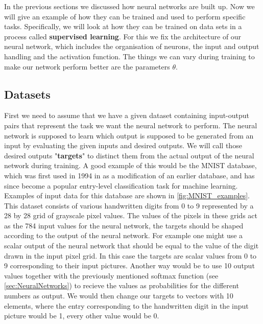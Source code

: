 In the previous sections we discussed how neural networks are built up. Now we will give an example of how they can be trained and used to perform specific tasks. Specifically, we will look at how they can be trained on data sets in a process called \textbf{supervised learning}. For this we fix the architecture of our neural network, which includes the organisation of neurons, the input and output handling and the activation function. The things we can vary during training to make our network perform better are the parameters $\theta$.

\subsection{Datasets}
First we need to assume that we have a given dataset containing input-output pairs that represent the task we want the neural network to perform. The neural network is supposed to learn which output is supposed to be generated from an input by evaluating the given inputs and desired outputs. We will call those desired outputs "\textbf{targets}" to distinct them from the actual output of the neural network during training. A good example of this would be the MNIST database, which was first used in 1994 in \cite{firstMNISTpaper} as a modification of an earlier database, and has since become a popular entry-level classification task for machine learning. Examples of input data for this database are shown in \cref{fig:MNIST_examples}. 
This dataset consists of various handwritten digits from 0 to 9 represented by a 28 by 28 grid of grayscale pixel values. The values of the pixels in these grids act as the 784 input values for the neural network, the targets should be shaped according to the output of the neural network. For example one might use a scalar output of the neural network that should be equal to the value of the digit drawn in the input pixel grid. In this case the targets are scalar values from 0 to 9 corresponding to their input pictures. Another way would be to use 10 output values together with the previously mentioned softmax function (see \cref{sec:NeuralNetworks}) to recieve the values as probabilities for the different numbers as output. We would then change our targets to vectors with 10 elements, where the entry corresponding to the handwritten digit in the input picture would be 1, every other value would be 0.\\
